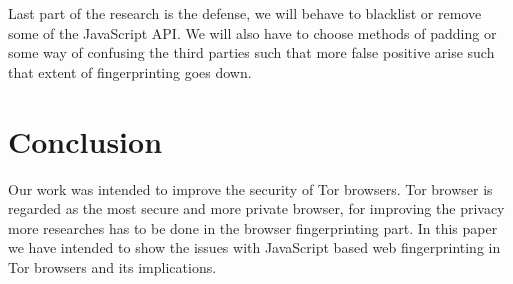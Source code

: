 \documentclass[conference]{IEEEtran}
\begin{document}
Last part of the research is the defense, we will behave to blacklist or remove some of the JavaScript API. We will also have to choose methods of padding or some way of confusing the third parties such that more false positive arise such that extent of fingerprinting goes down.

\section{Conclusion}
Our work was intended to improve the security of Tor browsers. Tor browser is regarded as the most secure and more private browser, for improving the privacy more researches has to be done in the browser fingerprinting part. In this paper we have intended to show the issues with JavaScript based web fingerprinting in Tor browsers and its implications.


%

\ifCLASSOPTIONcaptionsoff
  \newpage
\fi



\end{document}
